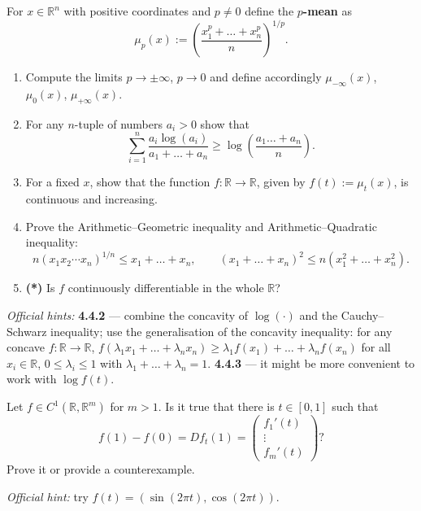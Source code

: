 \begin{exercise}
\label{ex:4.4}
For $x \in \mathbb{R}^n$ with positive coordinates and $p \neq 0$ define the \textbf{$p$-mean} as
$$\mu_p(x) := \left(\frac{x_1^p + \dots + x_n^p}{n}\right)^{1/p}.$$
\begin{enumerate}[label=\textbf{\arabic*.}]
  \item Compute the limits $p \to \pm\infty$, $p \to 0$ and define accordingly
    $\mu_{-\infty}(x)$, $\mu_0(x)$, $\mu_{+\infty}(x)$.
  \item For any $n$-tuple of numbers $a_i > 0$ show that
    $$\sum_{i=1}^{n} \frac{a_i\log(a_i)}{a_1 + \dots + a_n} \geq \log\left(\frac{a_1 \dots + a_n}{n}\right).$$
  \item For a fixed $x$, show that the function $f : \mathbb{R}\to\mathbb{R}$, given by
    $f(t) := \mu_t(x)$, is continuous and increasing.
  \item Prove the Arithmetic--Geometric inequality and Arithmetic--Quadratic inequality:
    $$n(x_1x_2\cdots x_n)^{1/n} \leq x_1 + \dots + x_n, \qquad (x_1+\dots+x_n)^2 \leq n(x_1^2+\dots+x_n^2).$$
  \item \textbf{(*)} Is $f$ continuously differentiable in the whole $\mathbb{R}$?
\end{enumerate}
\textit{Official hints:} \textbf{4.4.2} --- combine the concavity of $\log(\cdot)$ and the
Cauchy--Schwarz inequality; use the generalisation of the concavity inequality: for any concave
$f : \mathbb{R}\to\mathbb{R}$,
$f(\lambda_1x_1 + \dots + \lambda_nx_n) \geq \lambda_1f(x_1)+\dots+\lambda_nf(x_n)$ for all
$x_i \in \mathbb{R}$, $0 \leq \lambda_i \leq 1$ with $\lambda_1+\dots+\lambda_n = 1$.
\textbf{4.4.3} --- it might be more convenient to work with $\log f(t)$.
\end{exercise}

\begin{exercise}
\label{ex:4.5}
Let $f \in C^1(\mathbb{R},\mathbb{R}^m)$ for $m > 1$. Is it true that there is $t \in [0,1]$ such
that
$$f(1) - f(0) = Df_t(1) = \begin{pmatrix} f_1'(t) \\ \vdots \\ f_m'(t) \end{pmatrix}?$$
Prove it or provide a counterexample.

\textit{Official hint:} try $f(t) = (\sin(2\pi t), \cos(2\pi t))$.
\end{exercise}

